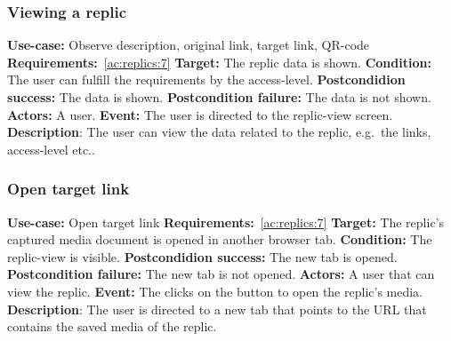 \subsubsection{Viewing a replic}\label{subsubsec:view-replic}
\textbf{Use-case:} Observe description, original link, target link, QR-code \newline
\textbf{Requirements:}~\ref{ac:replics:7} \newline
\textbf{Target:} The replic data is shown. \newline
\textbf{Condition:} The user can fulfill the requirements by the access-level. \newline
\textbf{Postcondidion success:} The data is shown. \newline
\textbf{Postcondition failure:} The data is not shown. \newline
\textbf{Actors:} A user. \newline
\textbf{Event:} The user is directed to the replic-view screen. \newline
\textbf{Description}: The user can view the data related to the replic, e.g.\ the links, access-level etc..

\subsubsection{Open target link}\label{subsubsec:open-target-link}
\textbf{Use-case:} Open target link \newline
\textbf{Requirements:}~\ref{ac:replics:7}\newline
\textbf{Target:} The replic's captured media document is opened in another browser tab. \newline
\textbf{Condition:} The replic-view is visible. \newline
\textbf{Postcondidion success:} The new tab is opened. \newline
\textbf{Postcondition failure:} The new tab is not opened. \newline
\textbf{Actors:} A user that can view the replic. \newline
\textbf{Event:} The clicks on the button to open the replic's media. \newline
\textbf{Description}: The user is directed to a new tab that points to the URL that contains the saved media of the replic.

